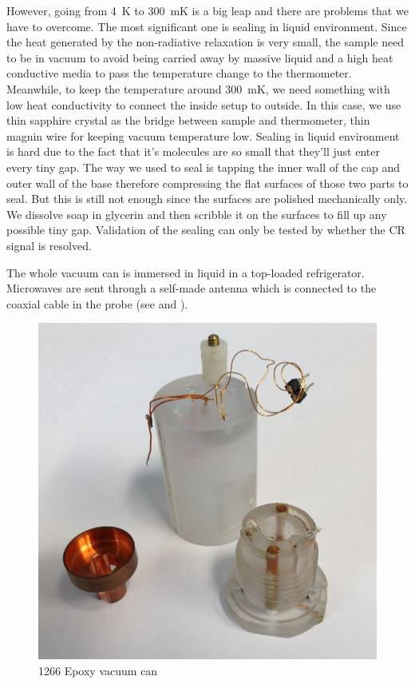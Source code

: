 \documentclass[12pt]{ruthesis}
\begin{document}
 
However, going from \SI{4}{\kelvin} to \SI{300}{\milli\kelvin} is a big leap and there are problems that we have to overcome.
The most significant one is sealing in  liquid environment.
Since the heat generated by the non-radiative relaxation is very small, the sample need to be in vacuum to avoid being carried away by massive  liquid and a high heat conductive media to pass the temperature change to the thermometer.
Meanwhile, to keep the temperature around \SI{300}{\milli\kelvin}, we need something with low heat conductivity to connect the inside setup to outside.
In this case, we use thin sapphire crystal as the bridge between sample and thermometer, thin magnin wire for keeping vacuum temperature low.
Sealing in  liquid environment is hard due to the fact that it's molecules are so small that they'll just enter every tiny gap.
The way we used to seal is tapping the inner wall of the cap and outer wall of the base therefore compressing the flat surfaces of those two parts to seal.
But this is still not enough since the surfaces are polished mechanically only.
We dissolve soap in glycerin and then scribble it on the surfaces to fill up any possible tiny gap.
Validation of the sealing can only be tested by whether the CR signal is resolved.

The whole vacuum can is immersed in liquid  in a top-loaded refrigerator.
Microwaves are sent through a self-made antenna which is connected to the coaxial cable in the probe (see  and ).

\begin{figure}
  \centering
  \includegraphics[scale=0.25]{figures/vacuumcan.JPG}
  \caption{1266 Epoxy vacuum can}
  \label{vacuum-can}
\end{figure}
 
\end{document}

